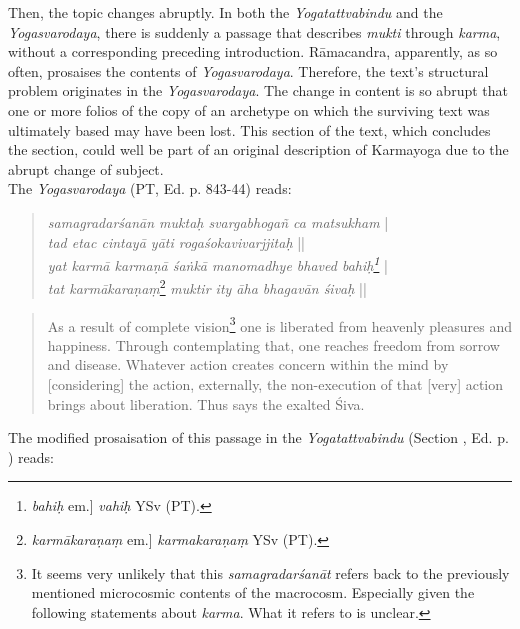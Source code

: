 Then, the topic changes abruptly. In both the \textit{Yogatattvabindu} and the \textit{Yogasvarodaya}, there is suddenly a passage that describes \textit{mukti} through \textit{karma}, without a corresponding preceding introduction. Rāmacandra, apparently, as so often, prosaises the contents of \textit{Yogasvarodaya}. Therefore, the text's structural problem originates in the \textit{Yogasvarodaya}. The change in content is so abrupt that one or more folios of the copy of an archetype on which the surviving text was ultimately based may have been lost. This section of the text, which concludes the  section, could well be part of an original description of Karmayoga due to the abrupt change of subject. \\

The \textit{Yogasvarodaya} (PT, Ed. p. 843-44) reads:

\begin{quote}
  \textit{samagradarśanān muktaḥ svargabhogañ ca matsukham} | \\
  \textit{tad etac cintayā yāti rogaśokavivarjjitaḥ} ||\\
  \textit{yat karmā karmaṇā śaṅkā manomadhye bhaved bahiḥ\footnote{\textit{bahiḥ} em.] \textit{vahiḥ} YSv (PT).}} |\\
  \textit{tat karmākaraṇaṃ}\footnote{\textit{karmākaraṇaṃ} em.] \textit{karmakaraṇaṃ} YSv (PT).} \textit{muktir ity āha bhagavān śivaḥ} ||
\end{quote}
\begin{quote}
  As a result of complete vision\footnote{It seems very unlikely that this \textit{samagradarśanāt} refers back to the previously mentioned microcosmic contents of the macrocosm. Especially given the following statements about \textit{karma}. What it refers to is unclear.} one is liberated from heavenly pleasures and happiness. Through contemplating that, one reaches freedom from sorrow and disease. Whatever action creates concern within the mind by [considering] the action, externally, the non-execution of that [very] action brings about liberation. Thus says the exalted Śiva.
\end{quote}

The modified prosaisation of this passage in the \textit{Yogatattvabindu} (Section , Ed. p. \pageref{ascetics}) reads:


